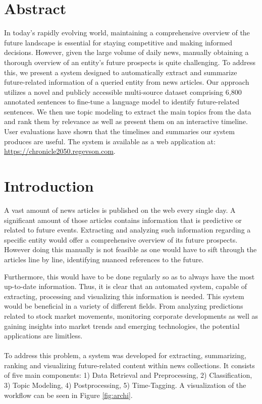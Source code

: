 \documentclass[12pt,oneside,bibtotoc,liststotoc]{scrbook}
\begin{document}
\listoftables
\renewcommand{\baselinestretch}{1.5}\normalsize

\newpage
\setcounter{page}{1}

\chapter*{Abstract}
In today's rapidly evolving world, maintaining a comprehensive overview of the future landscape is essential for staying competitive and making informed decisions. However, given the large volume of daily news, manually obtaining a thorough overview of an entity's future prospects is quite challenging. To address this, we present a system designed to automatically extract and summarize future-related information of a queried entity from news articles. Our approach utilizes a novel and publicly accessible multi-source dataset comprising 6,800 annotated sentences to fine-tune a language model to identify future-related sentences. We then use topic modeling to extract the main topics from the data and rank them by relevance as well as present them on an interactive timeline. User evaluations have shown that the timelines and summaries our system produces are useful. The system is available as a web application at: \url{https://chronicle2050.regevson.com}.




\chapter{Introduction}
A vast amount of news articles is published on the web every single day. A significant amount of those articles contains information that is predictive or related to future events. Extracting and analyzing such information regarding a specific entity would offer a comprehensive overview of its future prospects. However doing this manually is not feasible as one would have to sift through the articles line by line, identifying nuanced references to the future.

Furthermore, this would have to be done regularly so as to always have the most up-to-date information. Thus, it is clear that an automated system, capable of extracting, processing and visualizing this information is needed. This system would be beneficial in a variety of different fields. From analyzing predictions related to stock market movements, monitoring corporate developments as well as gaining insights into market trends and emerging technologies, the potential applications are limitless.
\\\\
To address this problem, a system was developed for extracting, summarizing, ranking and visualizing future-related content within news collections. It consists of five main components: 1) Data Retrieval and Preprocessing, 2) Classification, 3) Topic Modeling, 4) Postprocessing, 5) Time-Tagging. A visualization of the workflow can be seen in Figure \ref{fig:archi}.
\end{document}
